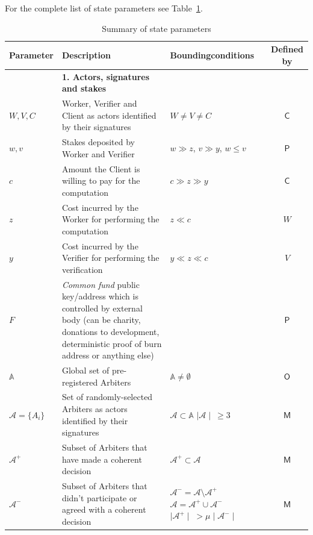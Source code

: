 \documentclass[a4paper]{article}
\begin{document}
For the complete list of state parameters see Table~\ref{table:state}.

\begin{table}[hp]
    \caption{Summary of state parameters}
    \label{table:state}
    \begin{adjustbox}{center}
        \begin{tabular}{@{} l m{11cm} m{2.5cm} c @{}}
            \toprule
            Parameter & Description & Bounding\-conditions & Defined by \\
            \midrule
&\textbf{1. Actors, signatures and stakes} \\
            $W, V, C$ & Worker, Verifier and Client as actors identified by their signatures & $W \ne V \ne C$ & $\mathsf{C}$ \\
            $w, v$ & Stakes deposited by Worker and Verifier & \makecell{$w \gg z$, $v \gg y$,\\ $w \le v$} & $\mathsf{P}$ \\
            $c$ & Amount the Client is willing to pay for the computation & $c \gg z \gg y$ & $\mathsf{C}$ \\
            $z$ & Cost incurred by the Worker for performing the computation & $z \ll c$ & $W$ \\
            $y$ & Cost incurred by the Verifier for performing the verification & $y \ll z \ll c$ & $V$ \\
            $F$ & \textit{Common fund} public key/address which is controlled by external body (can be charity, donations to development, deterministic proof of burn address or anything else) & & $\mathsf{P}$ \\
            $\mathbb{A}$ & Global set of pre-registered Arbiters & $\mathbb{A} \ne \emptyset$ & $\mathsf{O}$ \\
            $\mathcal{A} = \{A_i\}$ & Set of randomly-selected Arbiters as actors identified by their signatures & $\mathcal{A} \subset \mathbb{A}$ $\mid\mathcal{A}\mid\: \ge 3$ & $\mathsf{M}$ \\
            $\mathcal{A^+}$ & Subset of Arbiters that have made a coherent decision & $\mathcal{A^+} \subset \mathcal{A}$ & $\mathsf{M}$ \\
            $\mathcal{A^-}$ & Subset of Arbiters that didn't participate or agreed with a coherent decision & \makecell{$\mathcal{A^-} = \mathcal{A} \setminus \mathcal{A^+}$ \\ $\mathcal{A} = \mathcal{A^+} \cup \mathcal{A^-}$ \\ $\mid\mathcal{A^+}\mid\; > \mu \mid\mathcal{A^-}\mid$} & $\mathsf{M}$ \\

\end{tabular}
\end{adjustbox}
\end{table}
\end{document}
